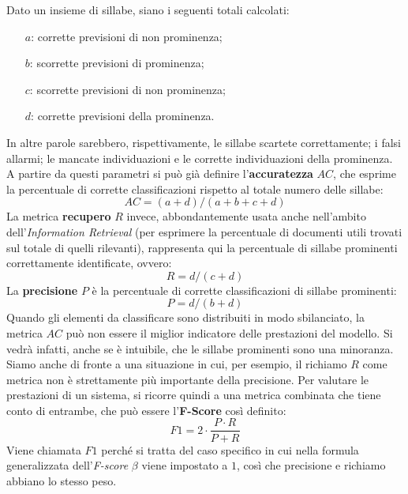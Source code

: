 \documentclass[twoside,twocolumn,10pt]{extarticle}
\theoremstyle{definition}
\begin{document}
		Dato un insieme di sillabe, siano i seguenti totali calcolati:
		\begin{itemize}
			\item[$a$:] corrette previsioni di non prominenza;
			\item[$b$:] scorrette previsioni di prominenza;
			\item[$c$:] scorrette previsioni di non prominenza;
			\item[$d$:] corrette previsioni della prominenza.
		\end{itemize}
		In altre parole sarebbero, rispettivamente, le sillabe scartete correttamente; i falsi allarmi; le mancate individuazioni e le corrette individuazioni della prominenza. A partire da questi parametri si può già definire l'\textbf{accuratezza} $AC$, che esprime la percentuale di corrette classificazioni rispetto al totale numero delle sillabe:
		\begin{equation}\label{eq:ac}
			AC = (a + d) / (a + b + c + d)
		\end{equation}
		La metrica \textbf{recupero} $R$ invece, abbondantemente usata anche nell'ambito dell'\textit{Information Retrieval} (per esprimere la percentuale di documenti utili trovati sul totale di quelli rilevanti), rappresenta qui la percentuale di sillabe prominenti correttamente identificate, ovvero:
		\begin{equation}\label{eq:r}
			R = d / (c + d)
		\end{equation}
		La \textbf{precisione} $P$ è la percentuale di corrette classificazioni di sillabe prominenti:
		\begin{equation}\label{eq:p}
			P = d / (b + d)
		\end{equation}
		Quando gli elementi da classificare sono distribuiti in modo sbilanciato, la metrica $AC$ può non essere il miglior indicatore delle prestazioni del modello. Si vedrà infatti, anche se è intuibile, che le sillabe prominenti sono una minoranza. Siamo anche di fronte a una situazione in cui, per esempio, il richiamo $R$ come metrica non è strettamente più importante della precisione. Per valutare le prestazioni di un sistema, si ricorre quindi a una metrica combinata che tiene conto di entrambe, che può essere l'\textbf{F-Score} così definito:
		\begin{equation}\label{eq:f}
			F1 = 2 \cdot \frac{P \cdot R}{P + R}
		\end{equation}
		Viene chiamata $F1$ perché si tratta del caso specifico in cui nella formula generalizzata dell'\textit{F-score} $\beta$ viene impostato a $1$, così che precisione e richiamo abbiano lo stesso peso.
	
\end{document}

